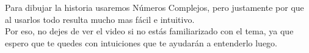 \documentclass[preview]{standalone}
\begin{document}
\begin{center}
Para dibujar la historia usaremos Números Complejos, pero justamente por que al usarlos todo resulta mucho mas fácil e intuitivo.
$$ $$ 
Por eso, no dejes de ver el video si no estás familiarizado con el tema, ya que espero que te quedes con intuiciones que te ayudarán a entenderlo luego.
\end{center}
\end{document}
